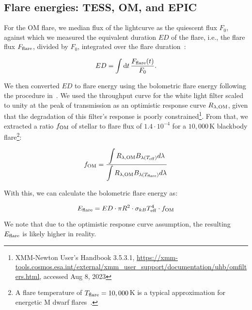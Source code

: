 \documentclass[twocolumn]{aastex631}
\begin{document}
\subsection{Flare energies: TESS, OM, and EPIC}

For the OM flare, we median flux of the lightcurve as the quiescent flux $F_0$, against which we measured the equivalent duration $ED$ of the flare, i.e., the flare flux $F_{\rm flare}$, divided by $F_0$, integrated over the flare duration~\citep{gershberg1972results}:

\begin{equation}
\label{eq:ED}
ED=\displaystyle \int \mathrm dt\, \frac{F_{\rm flare}(t)}{F_0}.
\end{equation}

We then converted $ED$ to flare energy using the bolometric flare energy following the procedure in~\citet{shibayama2013superflares}. We used the throughput curve for the white light filter scaled to unity at the peak of transmission as an optimistic response curve $R_{\lambda, \rm OM}$, given that the degradation of this filter's response is poorly constrained\footnote{XMM-Newton User's Handbook 3.5.3.1, \url{https://xmm-tools.cosmos.esa.int/external/xmm_user_support/documentation/uhb/omfilters.html}, accessed Aug 8, 2023}. From that, we extracted a ratio $f_{\rm OM}$ of stellar to flare flux of $1.4\cdot 10^{-4}$ for a $10,000\,$K blackbody flare\footnote{A flare temperature of $T_{\rm flare}=10,000\,$K is a typical approximation for energetic M dwarf flares~\citep{kowalski2013timeresolved, howard2020evryflarea}.}:

\begin{equation}
    f_{\rm OM} = \frac{\displaystyle\int R_{\lambda, \rm OM} B_{\lambda(T_{\rm eff})}  d\lambda}{\displaystyle\int R_{\lambda, \rm OM} B_{\lambda(T_{\rm flare})} d\lambda} 
    \label{eq:ratio}
\end{equation}

With this, we can calculate the bolometric flare energy as:

\begin{equation}
    E_{\rm flare} = ED \cdot \pi R^2 \cdot \sigma_{kB} T_{\rm eff}^4 \cdot f_{\rm OM}
    \label{eq:eflare}
\end{equation}

We note that due to the optimistic response curve assumption, the resulting $E_{\rm flare}$ is likely higher in reality.

\end{document}
